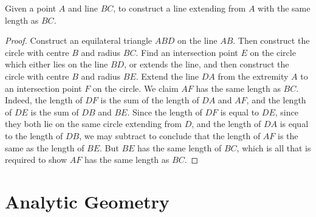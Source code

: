 \begin{theorem}
    Given a point $A$ and line $BC$, to construct a line extending from $A$ with the same length as $BC$.
\end{theorem}
\begin{proof}
    Construct an equilateral triangle $ABD$ on the line $AB$. Then construct the circle with centre $B$ and radius $BC$. Find an intersection point $E$ on the circle which either lies on the line $BD$, or extends the line, and then construct the circle with centre $B$ and radius $BE$. Extend the line $DA$ from the extremity $A$ to an intersection point $F$ on the circle. We claim $AF$ has the same length as $BC$. Indeed, the length of $DF$ is the sum of the length of $DA$ and $AF$, and the length of $DE$ is the sum of $DB$ and $BE$. Since the length of $DF$ is equal to $DE$, since they both lie on the same circle extending from $D$, and the length of $DA$ is equal to the length of $DB$, we may subtract to conclude that the length of $AF$ is the same as the length of $BE$. But $BE$ has the same length of $BC$, which is all that is required to show $AF$ has the same length as $BC$.
\end{proof}

\chapter{Analytic Geometry}

